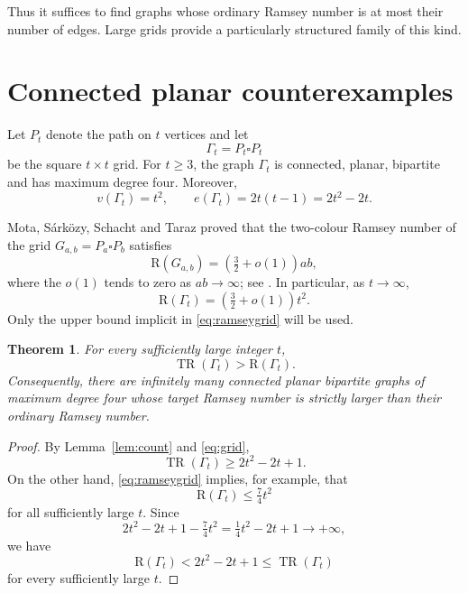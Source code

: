 \documentclass[11pt,reqno]{amsart}
\theoremstyle{plain}
\newtheorem{theorem}{Theorem}
\theoremstyle{definition}
\theoremstyle{remark}
\DeclareMathOperator{\TR}{TR}
\newcommand{\R}{\mathrm{R}}
\begin{document}
Thus it suffices to find graphs whose ordinary Ramsey number is at most their number of edges. Large grids provide a particularly structured family of this kind.

\section{Connected planar counterexamples}

Let $P_t$ denote the path on $t$ vertices and let
\[
\Gamma_t = P_t \square P_t
\]
be the square $t \times t$ grid. For $t \geq 3$, the graph $\Gamma_t$ is connected, planar, bipartite and has maximum degree four. Moreover,
\begin{equation}\label{eq:grid}
v(\Gamma_t) = t^2, \qquad e(\Gamma_t) = 2t(t-1) = 2t^2 - 2t.
\end{equation}

Mota, S\'ark\"ozy, Schacht and Taraz proved that the two-colour Ramsey number of the grid $G_{a,b} = P_a \square P_b$ satisfies
\[
\R(G_{a,b}) = \left( \tfrac{3}{2} + o(1) \right) ab,
\]
where the $o(1)$ tends to zero as $ab \to \infty$; see \cite[Corollary 1.4]{MSST}. In particular, as $t \to \infty$,
\begin{equation}\label{eq:ramseygrid}
\R(\Gamma_t) = \left( \tfrac{3}{2} + o(1) \right) t^2.
\end{equation}
Only the upper bound implicit in \eqref{eq:ramseygrid} will be used.

\begin{theorem}\label{thm:planar}
For every sufficiently large integer $t$,
\[
\TR(\Gamma_t) > \R(\Gamma_t).
\]
Consequently, there are infinitely many connected planar bipartite graphs of maximum degree four whose target Ramsey number is strictly larger than their ordinary Ramsey number.
\end{theorem}

\begin{proof}
By Lemma~\ref{lem:count} and \eqref{eq:grid},
\begin{equation}\label{eq:trgrid}
\TR(\Gamma_t) \geq 2t^2 - 2t + 1.
\end{equation}
On the other hand, \eqref{eq:ramseygrid} implies, for example, that
\[
\R(\Gamma_t) \leq \tfrac{7}{4} t^2
\]
for all sufficiently large $t$. Since
\[
2t^2 - 2t + 1 - \tfrac{7}{4} t^2 = \tfrac{1}{4} t^2 - 2t + 1 \longrightarrow +\infty,
\]
we have
\[
\R(\Gamma_t) < 2t^2 - 2t + 1 \leq \TR(\Gamma_t)
\]
for every sufficiently large $t$.
\end{proof}
\end{document}
